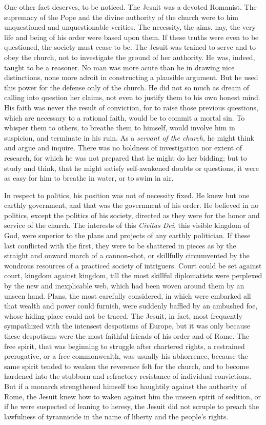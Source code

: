 \documentclass[]{book}
\begin{document}
One other fact deserves, to be noticed. The Jesuit was a devoted Romanist. The supremacy of the Pope and the divine authority of the church were to him unquestioned and unquestionable verities. The necessity, the aims, nay, the very life and being of his order were based upon them. If these truths were even to be questioned, the society must cease to be. The Jesuit was trained to serve and to obey the church, not to investigate the ground of her authority. He was, indeed, taught to be a reasoner. No man was more acute than he in drawing nice distinctions, none more adroit in constructing a plausible argument. But he used this power for the defense only of the church. He did not so much as dream of calling into question her claims, not even to justify them to his own honest mind. His faith was never the result of conviction, for to raise those previous questions, which are necessary to a rational faith, would be to commit a mortal sin. To whisper them to others, to breathe them to himself, would involve him in suspicion, and terminate in his ruin. As a \emph{servant of the church,} he might think and argue and inquire. There was no boldness of investigation nor extent of research, for which he was not prepared that he might do her bidding; but to study and think, that he might satisfy self-awakened doubts or questions, it were as easy for him to breathe in water, or to swim in air.

In respect to politics, his position was not of necessity fixed. He knew but one earthly government, and that was the government of his order. He believed in no politics, except the politics of his society, directed as they were for the honor and service of the church. The interests of this \emph{Civitas Dei}, this visible kingdom of God, were superior to the plans and projects of any earthly politician. If these last conflicted with the first, they were to be shattered in pieces as by the straight and onward march of a cannon-shot, or skillfully circumvented by the wondrous resources of a practiced society of intriguers. Court could be set against court, kingdom against kingdom, till the most skillful diplomatists were perplexed by the new and inexplicable web, which had been woven around them by an unseen hand. Plans, the most carefully considered, in which were embarked all that wealth and power could furnish, were suddenly baffled by an ambushed foe, whose hiding-place could not be traced. The Jesuit, in fact, most frequently sympathized with the intensest despotisms of Europe, but it was only because these despotisms were the most faithful friends of his order and of Rome. The free spirit, that was beginning to struggle after chartered rights, a restrained prerogative, or a free commonwealth, was usually his abhorrence, because the same spirit tended to weaken the reverence felt for the church, and to become hardened into the stubborn and refractory resistance of individual convictions. But if a monarch strengthened himself too haughtily against the authority of Rome, the Jesuit knew how to waken against him the unseen spirit of sedition, or if he were suspected of leaning to heresy, the Jesuit did not scruple to preach the lawfulness of tyrannicide in the name of liberty and the people's rights.
\end{document}
